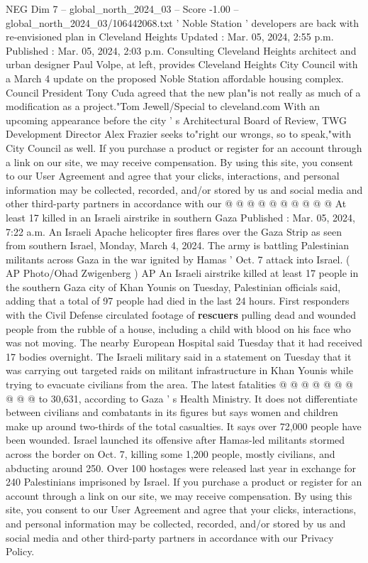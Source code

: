 \begin{textsample}{NEG Dim 7 – global\_north\_2024\_03 – Score -1.00 – global\_north\_2024\_03/106442068.txt}  \label{ex:f7_neg_420}
' Noble Station ' developers are back with re-envisioned plan in Cleveland Heights Updated : Mar. 05, 2024, 2:55 p.m.
Published : Mar. 05, 2024, 2:03 p.m.
Consulting Cleveland Heights architect and urban designer Paul Volpe, at left, provides Cleveland Heights City Council with a March 4 update on the proposed Noble Station affordable housing complex.
Council President Tony Cuda agreed that the new plan"is not really as much of a modification as a project."Tom Jewell/Special to cleveland.com With an upcoming appearance before the city ' s Architectural Board of Review, TWG Development Director Alex Frazier seeks to"right our wrongs, so to speak,"with City Council as well.
If you purchase a product or register for an account through a link on our site, we may receive compensation.
By using this site, you consent to our User Agreement and agree that your clicks, interactions, and personal information may be collected, recorded, and/or stored by us and social media and other third-party partners in accordance with our @ @ @ @ @ @ @ @ @ @ At least 17 killed in an Israeli airstrike in southern Gaza Published : Mar. 05, 2024, 7:22 a.m.
An Israeli Apache helicopter fires flares over the Gaza Strip as seen from southern Israel, Monday, March 4, 2024.
The army is battling Palestinian militants across Gaza in the war ignited by Hamas ' Oct. 7 attack into Israel. ( AP Photo/Ohad Zwigenberg ) AP An Israeli airstrike killed at least 17 people in the southern Gaza city of Khan Younis on Tuesday, Palestinian officials said, adding that a total of 97 people had died in the last 24 hours.
First responders with the Civil Defense circulated footage of \textbf{rescuers} pulling dead and wounded people from the rubble of a house, including a child with blood on his face who was not moving.
The nearby European Hospital said Tuesday that it had received 17 bodies overnight.
The Israeli military said in a statement on Tuesday that it was carrying out targeted raids on militant infrastructure in Khan Younis while trying to evacuate civilians from the area.
The latest fatalities @ @ @ @ @ @ @ @ @ @ to 30,631, according to Gaza ' s Health Ministry.
It does not differentiate between civilians and combatants in its figures but says women and children make up around two-thirds of the total casualties.
It says over 72,000 people have been wounded.
Israel launched its offensive after Hamas-led militants stormed across the border on Oct. 7, killing some 1,200 people, mostly civilians, and abducting around 250.
Over 100 hostages were released last year in exchange for 240 Palestinians imprisoned by Israel.
If you purchase a product or register for an account through a link on our site, we may receive compensation.
By using this site, you consent to our User Agreement and agree that your clicks, interactions, and personal information may be collected, recorded, and/or stored by us and social media and other third-party partners in accordance with our Privacy Policy.

\end{textsample}
